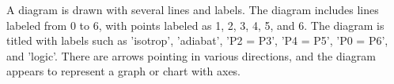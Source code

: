 A diagram is drawn with several lines and labels. The diagram includes lines labeled from 0 to 6, with points labeled as 1, 2, 3, 4, 5, and 6. The diagram is titled with labels such as 'isotrop', 'adiabat', 'P2 = P3', 'P4 = P5', 'P0 = P6', and 'logic'. There are arrows pointing in various directions, and the diagram appears to represent a graph or chart with axes.